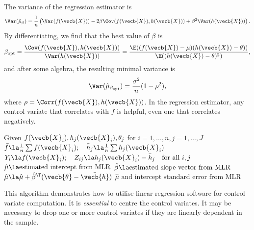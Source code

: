 The variance of the regression estimator is
\begin{equation}
	\Var(\hat{\mu}_{\beta}) = \frac{1}{n} \left(\Var(f(\vecb{X})) - 2\beta \Cov(f(\vecb{X}), h(\vecb{X})) + \beta^2 \Var(h(\vecb{X}))\right).
	\label{eq:RegressionEstimatorVariance}
\end{equation}
By differentiating, we find that the best value of $\beta$ is
\begin{equation}
	\beta_{\text{opt}} = \frac{\Cov(f(\vecb{X}), h(\vecb{X}))}{\Var(h(\vecb{X}))} = \frac{\E((f(\vecb{X}) - \mu) (h(\vecb{X}) - \theta))}{\E((h(\vecb{X}) - \theta)^2)},
	\label{eq:BetaOptFormula}
\end{equation}
and after some algebra, the resulting minimal variance is
\begin{equation}
	\Var(\hat{\mu}_{\beta_{\text{opt}}}) = \frac{\sigma^2}{n} (1 - \rho^2),
	\label{eq:MinVarianceRho}
\end{equation}
where $\rho = \Corr(f(\vecb{X}), h(\vecb{X}))$. In the regression estimator, any control variate that correlates with $f$ is helpful, even one that correlates negatively.

\begin{algorithm}[H]
	\caption{Control Variates by Regression}
	\label{alg:ControlVariatesbyRegression}
	\begin{algorithmic}[1]
		\Require Given $f(\vecb{X}_i), h_j(\vecb{X}_i), \theta_j$ for $i=1,\dots,n, j=1,\dots,J$
		\State $\bar{f} \la \frac{1}{n}\sum f(\vecb{X}_i); \quad \bar{h}_j \la \frac{1}{n}\sum h_j(\vecb{X}_i)$
		\State $Y_{i} \la f(\vecb{X}_i); \quad Z_{i j} \la h_j(\vecb{X}_i) - \bar{h}_j \quad \text{for all } i, j$
		\State $\hat{\mu} \la \text{estimated intercept from MLR}$
		\State $\hat{\beta} \la \text{estimated slope vector from MLR}$
		\State $\hat{\mu} \la \hat{\mu} + \hat{\beta}^{\T} (\vecb{\theta} - \bar{\vecb{h}})$
		\State \Return $\hat{\mu} \text{ and intercept standard error from MLR}$
	\end{algorithmic}
\end{algorithm}

This algorithm demonstrates how to utilise linear regression software for control variate computation. It is \textit{essential} to centre the control variates. It may be necessary to drop one or more control variates if they are linearly dependent in the sample.

